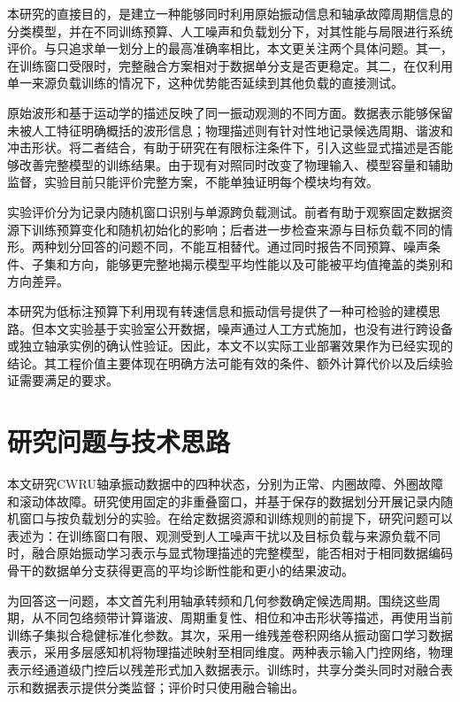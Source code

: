 \documentclass[UTF8,12pt,openany,twoside]{ctexbook}
\numberwithin{equation}{chapter}
\begin{document}
本研究的直接目的，是建立一种能够同时利用原始振动信息和轴承故障周期信息的分类模型，并在不同训练预算、人工噪声和负载划分下，对其性能与局限进行系统评价。与只追求单一划分上的最高准确率相比，本文更关注两个具体问题。其一，在训练窗口受限时，完整融合方案相对于数据单分支是否更稳定。其二，在仅利用单一来源负载训练的情况下，这种优势能否延续到其他负载的直接测试。

原始波形和基于运动学的描述反映了同一振动观测的不同方面。数据表示能够保留未被人工特征明确概括的波形信息；物理描述则有针对性地记录候选周期、谐波和冲击形状。将二者结合，有助于研究在有限标注条件下，引入这些显式描述是否能够改善完整模型的训练结果。由于现有对照同时改变了物理输入、模型容量和辅助监督，实验目前只能评价完整方案，不能单独证明每个模块均有效。

实验评价分为记录内随机窗口识别与单源跨负载测试。前者有助于观察固定数据资源下训练预算变化和随机初始化的影响；后者进一步检查来源与目标负载不同的情形。两种划分回答的问题不同，不能互相替代。通过同时报告不同预算、噪声条件、子集和方向，能够更完整地揭示模型平均性能以及可能被平均值掩盖的类别和方向差异。

本研究为低标注预算下利用现有转速信息和振动信号提供了一种可检验的建模思路。但本文实验基于实验室公开数据，噪声通过人工方式施加，也没有进行跨设备或独立轴承实例的确认性验证。因此，本文不以实际工业部署效果作为已经实现的结论。其工程价值主要体现在明确方法可能有效的条件、额外计算代价以及后续验证需要满足的要求。

\section{研究问题与技术思路}\label{ux7814ux7a76ux95eeux9898ux4e0eux6280ux672fux601dux8def}

本文研究CWRU轴承振动数据中的四种状态，分别为正常、内圈故障、外圈故障和滚动体故障。研究使用固定的非重叠窗口，并基于保存的数据划分开展记录内随机窗口与按负载划分的实验。在给定数据资源和训练规则的前提下，研究问题可以表述为：在训练窗口有限、观测受到人工噪声干扰以及目标负载与来源负载不同时，融合原始振动学习表示与显式物理描述的完整模型，能否相对于相同数据编码骨干的数据单分支获得更高的平均诊断性能和更小的结果波动。

为回答这一问题，本文首先利用轴承转频和几何参数确定候选周期。围绕这些周期，从不同包络频带计算谐波、周期重复性、相位和冲击形状等描述，再使用当前训练子集拟合稳健标准化参数。其次，采用一维残差卷积网络从振动窗口学习数据表示，采用多层感知机将物理描述映射至相同维度。两种表示输入门控网络，物理表示经通道级门控后以残差形式加入数据表示。训练时，共享分类头同时对融合表示和数据表示提供分类监督；评价时只使用融合输出。
\end{document}
